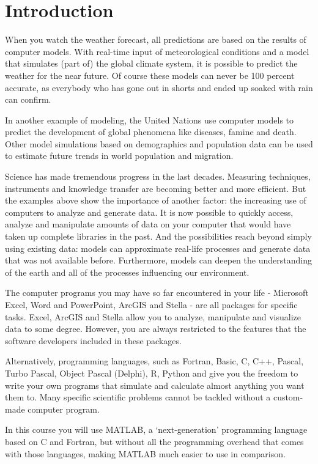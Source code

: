 \chapter{Introduction}
\thispagestyle{fancy}

When you watch the weather forecast, all predictions are based on the results of computer models. With real-time input of meteorological conditions and a model that simulates (part of) the global climate system, it is possible to predict the weather for the near future. Of course these models can never be 100 percent accurate, as everybody who has gone out in shorts and ended up soaked with rain can confirm.

In another example of modeling, the United Nations use computer models to predict the development of global phenomena like diseases, famine and death. Other model simulations based on demographics and population data can be used to estimate future trends in world population and migration.

Science has made tremendous progress in the last decades. Measuring techniques, instruments and knowledge transfer are becoming better and more efficient. But the examples above show the importance of another factor: the increasing use of computers to analyze and generate data. It is now possible to quickly access, analyze and manipulate amounts of data on your computer that would have taken up complete libraries in the past. And the possibilities reach beyond simply using existing data: models can approximate real-life processes and generate data that was not available before. Furthermore, models can deepen the understanding of the earth and all of the processes influencing our environment.

The computer programs you may have so far encountered in your life - Microsoft Excel, Word and PowerPoint, ArcGIS and Stella - are all packages for specific tasks. Excel, ArcGIS and Stella allow you to analyze, manipulate and visualize data to some degree. However, you are always restricted to the features that the software developers included in these packages. 

Alternatively, programming languages, such as Fortran, Basic, C, C++, Pascal, Turbo Pascal, Object Pascal (Delphi), R, Python and \MATLAB{} give you the freedom to write your own programs that simulate and calculate almost anything you want them to. Many specific scientific problems cannot be tackled without a custom-made computer program. 

In this course you will use MATLAB, a `next-generation' programming language based on C and Fortran, but without all the programming overhead that comes with those languages, making MATLAB much easier to use in comparison.

